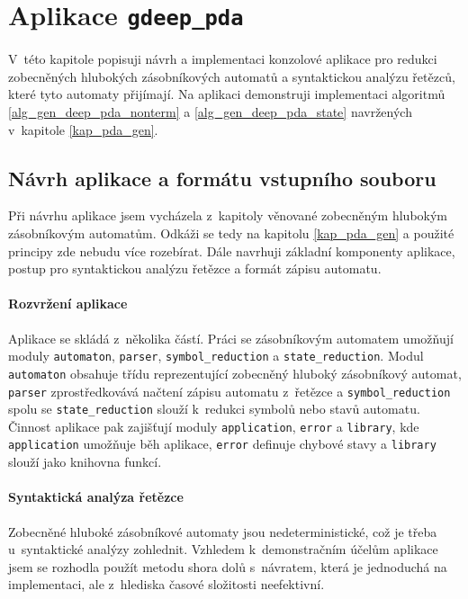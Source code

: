 
\chapter{Aplikace \texttt{gdeep\_pda}} \label{kap_aplikace}

V~této kapitole popisuji návrh a implementaci konzolové aplikace pro redukci zobecněných hlubokých zásobníkových automatů a syntaktickou analýzu řetězců, které tyto automaty přijímají. Na aplikaci demonstruji implementaci algoritmů \ref{alg_gen_deep_pda_nonterm} a \ref{alg_gen_deep_pda_state} navržených v~kapitole \ref{kap_pda_gen}.


\section{Návrh aplikace a formátu vstupního souboru}

Při návrhu aplikace jsem vycházela z~kapitoly věnované zobecněným hlubokým zásobníkovým automatům. Odkáži se tedy na kapitolu \ref{kap_pda_gen} a použité principy zde nebudu více rozebírat. Dále navrhuji základní komponenty aplikace, postup pro syntaktickou analýzu řetězce a formát zápisu automatu. 

\subsubsection{Rozvržení aplikace}\label{kap_aplikace_rozvrzeni}

Aplikace se skládá z~několika částí. Práci se zásobníkovým automatem umožňují moduly \texttt{automaton}, \texttt{parser}, \texttt{symbol\_reduction} a \texttt{state\_reduction}. 
Modul \texttt{automaton} obsahuje třídu reprezentující zobecněný hluboký zásobníkový automat, \texttt{parser} zprostředkovává načtení zápisu automatu z~řetězce a \texttt{symbol\_reduction} spolu se \texttt{state\_reduction} slouží k~redukci symbolů nebo stavů automatu.
Činnost aplikace pak zajišťují moduly \texttt{application}, \texttt{error} a \texttt{library}, kde \texttt{application} umožňuje běh aplikace, \texttt{error} definuje chybové stavy a \texttt{library} slouží jako knihovna funkcí.

\subsubsection{Syntaktická analýza řetězce}\label{kap_aplikace_analyza}

Zobecněné hluboké zásobníkové automaty jsou nedeterministické, což je třeba u~syntaktické analýzy zohlednit. Vzhledem k~demonstračním účelům aplikace jsem se rozhodla použít metodu shora dolů s~návratem, která je jednoduchá na implementaci, ale z~hlediska časové složitosti neefektivní.


